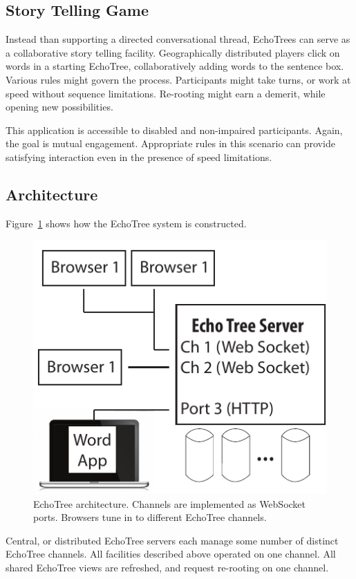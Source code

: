 \documentclass{sigchi}
\begin{document}
\subsection{Story Telling Game}

Instead than supporting a directed conversational thread,
EchoTrees can serve as a collaborative story telling
facility. Geographically distributed players click on words in a
starting EchoTree, collaboratively adding words to the sentence
box. Various rules might govern the process. Participants might take
turns, or work at speed without sequence limitations. Re-rooting might
earn a demerit, while opening new possibilities. 

This application is accessible to disabled and non-impaired
participants. Again, the goal is mutual engagement. Appropriate rules
in this scenario can provide satisfying interaction even in the
presence of speed limitations.

\subsection{Architecture}

Figure~\ref{fig:arch} shows how the EchoTree system is
constructed. 
\begin{figure}
   \centering
   \includegraphics[width=\columnwidth]{Figs/echoTreeArch.pdf}
   \caption{EchoTree architecture. Channels are implemented as
     WebSocket ports. Browsers tune in to different EchoTree channels.}
   \label{fig:arch}
\end{figure}
Central, or distributed EchoTree servers each manage some
number of distinct EchoTree channels. All facilities described above
operated on one channel. All shared EchoTree views are refreshed, and
request re-rooting on one channel. 
\end{document}
